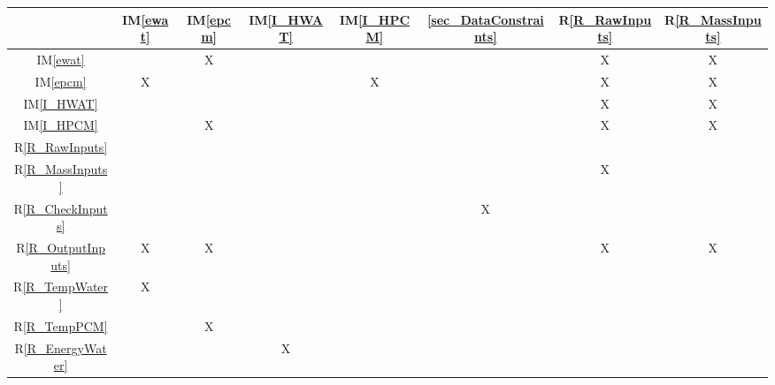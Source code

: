 \documentclass[12pt]{article}
\newcommand{\iref}[1]{IM\ref{#1}}
\newcommand{\rref}[1]{R\ref{#1}}
\begin{document}
\begin{table}[h!]
  \centering
  \begin{tabular}{|c|c|c|c|c|c|c|c|}
    \hline
                           & \iref{ewat} & \iref{epcm} & \iref{I_HWAT} & \iref{I_HPCM} & \ref{sec_DataConstraints} & \rref{R_RawInputs} & \rref{R_MassInputs} \\
    \hline
    \iref{ewat}            &             & X           &               &               &                           & X                  & X                   \\ \hline
    \iref{epcm}            & X           &             &               & X             &                           & X                  & X                   \\ \hline
    \iref{I_HWAT}          &             &             &               &               &                           & X                  & X                   \\ \hline
    \iref{I_HPCM}          &             & X           &               &               &                           & X                  & X                   \\ \hline
    \rref{R_RawInputs}     &             &             &               &               &                           &                    &                     \\ \hline
    \rref{R_MassInputs}    &             &             &               &               &                           & X                  &                     \\ \hline
    \rref{R_CheckInputs}   &             &             &               &               & X                         &                    &                     \\ \hline
    \rref{R_OutputInputs}  & X           & X           &               &               &                           & X                  & X                   \\ \hline
    \rref{R_TempWater}     & X           &             &               &               &                           &                    &                     \\ \hline
    \rref{R_TempPCM}       &             & X           &               &               &                           &                    &                     \\ \hline
    \rref{R_EnergyWater}   &             &             & X             &               &                           &                    &                     \\ \hline

\end{tabular}
\end{table}
\end{document}
